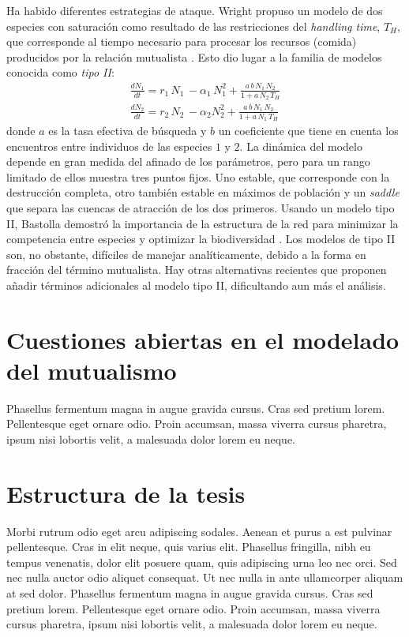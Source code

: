 Ha habido diferentes estrategias de ataque. Wright propuso un modelo de dos especies con saturación como resultado de las restricciones del \textit{handling time}, $T_H$, que corresponde al tiempo necesario para procesar los recursos (comida) producidos por la relación mutualista \cite{wright1989}. Esto dio lugar a la familia de modelos conocida como \textit{tipo II}:
\begin{align}
\frac{dN_1}{dt}=r_1\, N_1\, - \alpha_1 \, N_1^2+ \frac{a\, b\, N_1\,N_2}{1+ a\, N_2\,T_H} \nonumber\\
\frac{dN_2}{dt}=r_2\, N_2\, - \alpha_2 N_2^2 + \frac{a\,b\,N_1\,N_2}{1+a\, N_1\, T_H}
\label{eq_typeII}
\end{align}
\noindent donde $a$ es la tasa efectiva de búsqueda y $b$ un coeficiente que tiene en cuenta los encuentros entre individuos de las especies $1$ y $2$. La dinámica del modelo depende en gran medida del afinado de los parámetros, pero para un rango limitado de ellos muestra tres puntos fijos. Uno estable, que corresponde con la destrucción completa, otro también estable en máximos de población y un \textit{saddle} que separa las cuencas de atracción de los dos primeros. Usando un modelo tipo II, Bastolla demostró la importancia de la estructura de la red para minimizar la competencia entre especies y optimizar la biodiversidad \cite{bastolla2005,bastolla2009}. Los modelos de tipo II son, no obstante, difíciles de manejar analíticamente, debido a la forma en fracción del término mutualista. Hay otras alternativas recientes \cite{johnson2013} que proponen añadir términos adicionales al modelo tipo II, dificultando aun más el análisis.


\section{Cuestiones abiertas en el modelado del mutualismo}

Phasellus fermentum magna in augue gravida cursus. Cras sed pretium lorem. Pellentesque eget ornare odio. Proin accumsan, massa viverra cursus pharetra, ipsum nisi lobortis velit, a malesuada dolor lorem eu neque.


\section{Estructura de la tesis}
Morbi rutrum odio eget arcu adipiscing sodales. Aenean et purus a est pulvinar pellentesque. Cras in elit neque, quis varius elit. Phasellus fringilla, nibh eu tempus venenatis, dolor elit posuere quam, quis adipiscing urna leo nec orci. Sed nec nulla auctor odio aliquet consequat. Ut nec nulla in ante ullamcorper aliquam at sed dolor. Phasellus fermentum magna in augue gravida cursus. Cras sed pretium lorem. Pellentesque eget ornare odio. Proin accumsan, massa viverra cursus pharetra, ipsum nisi lobortis velit, a malesuada dolor lorem eu neque.
